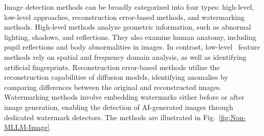 Image detection methods can be broadly categorized into four types: high-level, low-level approaches, reconstruction error-based methods, and watermarking methods. High-level methods analyze geometric information, such as abnormal lighting, shadows, and reflections. They also examine human anatomy, including pupil reflections and body abnormalities in images. In contrast, low-level~\cite{yang2021mtd} feature methods rely on spatial and frequency domain analysis, as well as identifying artificial fingerprints. Reconstruction error-based methods utilize the reconstruction capabilities of diffusion models, identifying anomalies by comparing differences between the original and reconstructed images.
Watermarking methods involve embedding watermarks either before or after image generation, enabling the detection of AI-generated images through dedicated watermark detectors. The methods are illustrated in Fig.~\ref{fig:Non-MLLM-Image}.
